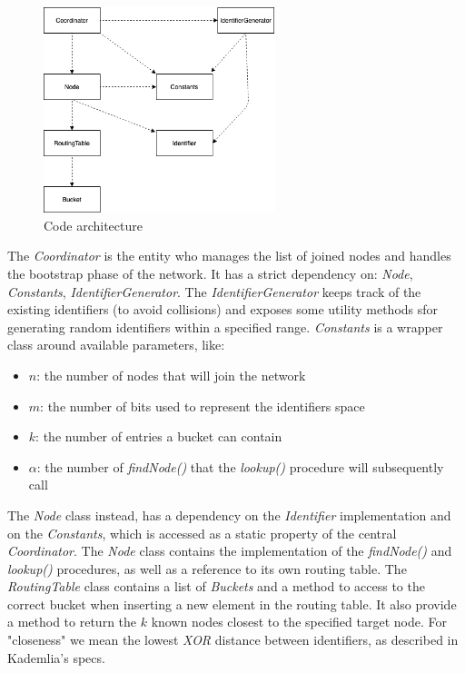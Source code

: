 \documentclass[12pt]{article}
\begin{document}
\begin{figure}[H]
    \centering
    \includegraphics[width=0.6\textwidth]{assets/architecture.png}
    \caption{Code architecture}
    \label{fig:code_architecture}
\end{figure}
The \textit{Coordinator} is the entity who manages the list of joined nodes and handles the bootstrap phase of the network. It has a strict dependency on: \textit{Node}, \textit{Constants}, \textit{IdentifierGenerator}. The \textit{IdentifierGenerator} keeps track of the existing identifiers (to avoid collisions) and exposes some utility methods  sfor generating random identifiers within a specified range. \textit{Constants} is a wrapper class around available parameters, like:
\begin{itemize}
    \item $n$: the number of nodes that will join the network
    \item $m$: the number of bits used to represent the identifiers space
    \item $k$: the number of entries a bucket can contain
    \item $\alpha$: the number of \textit{findNode()} that the \textit{lookup()} procedure will subsequently call
\end{itemize}
The \textit{Node} class instead, has a dependency on the \textit{Identifier} implementation and on the \textit{Constants}, which is accessed as a static property of the central \textit{Coordinator}. The \textit{Node} class contains the implementation of the \textit{findNode()} and \textit{lookup()} procedures, as well as a reference to its own routing table. The \textit{RoutingTable} class contains a list of \textit{Buckets} and a method to access to the correct bucket when inserting a new element in the routing table. It also provide a method to return the $k$ known nodes closest to the specified target node. For "closeness" we mean the lowest \textit{XOR} distance between identifiers, as described in Kademlia's specs.
\end{document}
